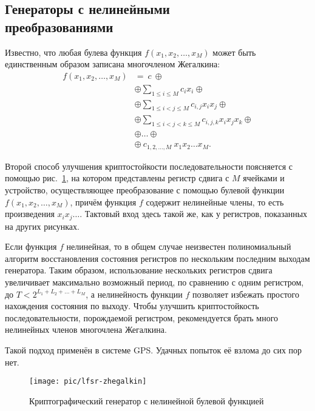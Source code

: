 \subsection[Генераторы с нелинейными преобразованиями]{Генераторы с нелинейными \protect\\ преобразованиями}

Известно, что любая булева функция $f(x_1, x_2, \dots, x_M)$ может быть единственным образом записана многочленом Жегалкина:
\[ \begin{array}{ll}
    f(x_1, x_2, \dots, x_M) & = ~c~ \oplus \\
    & \oplus \sum\limits_{1 \leq i \leq M} c_i x_i \oplus \\
    & \oplus \sum\limits_{1 \leq i < j \leq M} c_{i,j} x_i x_j \oplus \\
    & \oplus \sum\limits_{1 \leq i < j < k \leq M} c_{i,j,k} x_i x_j x_k \oplus \\
    & \oplus \dots \oplus \\
    & \oplus ~ c_{1,2,\dots,M} ~ x_1 x_2 \dots x_M.
\end{array} \]


Второй способ улучшения криптостойкости последовательности поясняется с помощью рис.~\ref{fig:lfsr-zhegalkin}, на котором представлены регистр сдвига с $M$ ячейками и устройство, осуществляющее преобразование с помощью булевой функции $f(x_1, x_2, \dots, x_M)$, причём функция $f$ содержит нелинейные члены, то есть произведения $x_i x_j \dots$. Тактовый вход здесь такой же, как у регистров, показанных на других рисунках.

Если функция $f$ нелинейная, то в общем случае неизвестен полиномиальный алгоритм восстановления состояния регистров по нескольким последним выходам генератора. Таким образом, использование нескольких регистров сдвига увеличивает максимально возможный период, по сравнению с одним регистром, до $T < 2^{L_1 + L_2 + \dots + L_M}$, а нелинейность функции $f$ позволяет избежать простого нахождения состояния по выходу. Чтобы улучшить криптостойкость последовательности, порождаемой регистром, рекомендуется брать много нелинейных членов многочлена Жегалкина.

Такой подход применён в системе GPS. Удачных попыток её взлома до сих пор нет.

\begin{figure}[!ht]
    \centering
	\texttt{[image: pic/lfsr-zhegalkin]}
    \caption{Криптографический генератор с нелинейной булевой функцией\label{fig:lfsr-zhegalkin}}
\end{figure}
